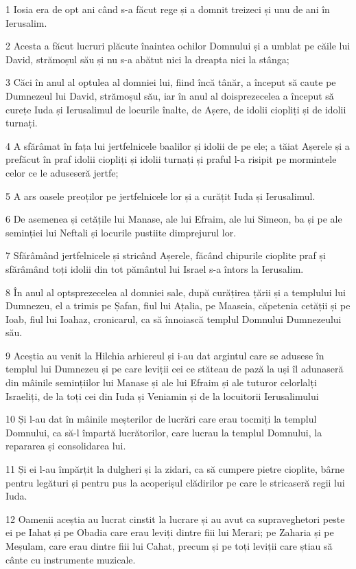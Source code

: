 \par 1 Iosia era de opt ani când s-a făcut rege și a domnit treizeci și unu de ani în Ierusalim.
\par 2 Acesta a făcut lucruri plăcute înaintea ochilor Domnului și a umblat pe căile lui David, strămoșul său și nu s-a abătut nici la dreapta nici la stânga;
\par 3 Căci în anul al optulea al domniei lui, fiind încă tânăr, a început să caute pe Dumnezeul lui David, strămoșul său, iar în anul al doisprezecelea a început să curețe Iuda și Ierusalimul de locurile înalte, de Așere, de idolii ciopliți și de idolii turnați.
\par 4 A sfărâmat în fața lui jertfelnicele baalilor și idolii de pe ele; a tăiat Așerele și a prefăcut în praf idolii ciopliți și idolii turnați și praful l-a risipit pe mormintele celor ce le aduseseră jertfe;
\par 5 A ars oasele preoților pe jertfelnicele lor și a curățit Iuda și Ierusalimul.
\par 6 De asemenea și cetățile lui Manase, ale lui Efraim, ale lui Simeon, ba și pe ale seminției lui Neftali și locurile pustiite dimprejurul lor.
\par 7 Sfărâmând jertfelnicele și stricând Așerele, făcând chipurile cioplite praf și sfărâmând toți idolii din tot pământul lui Israel s-a întors la Ierusalim.
\par 8 În anul al optsprezecelea al domniei sale, după curățirea țării și a templului lui Dumnezeu, el a trimis pe Șafan, fiul lui Ațalia, pe Maaseia, căpetenia cetății și pe Ioab, fiul lui Ioahaz, cronicarul, ca să înnoiască templul Domnului Dumnezeului său.
\par 9 Aceștia au venit la Hilchia arhiereul și i-au dat argintul care se adusese în templul lui Dumnezeu și pe care leviții cei ce stăteau de pază la uși îl adunaseră din mâinile semințiilor lui Manase și ale lui Efraim și ale tuturor celorlalți Israeliți, de la toți cei din Iuda și Veniamin și de la locuitorii Ierusalimului
\par 10 Și l-au dat în mâinile meșterilor de lucrări care erau tocmiți la templul Domnului, ca să-l împartă lucrătorilor, care lucrau la templul Domnului, la repararea și consolidarea lui.
\par 11 Și ei l-au împărțit la dulgheri și la zidari, ca să cumpere pietre cioplite, bârne pentru legături și pentru pus la acoperișul clădirilor pe care le stricaseră regii lui Iuda.
\par 12 Oamenii aceștia au lucrat cinstit la lucrare și au avut ca supraveghetori peste ei pe Iahat și pe Obadia care erau leviți dintre fiii lui Merari; pe Zaharia și pe Meșulam, care erau dintre fiii lui Cahat, precum și pe toți leviții care știau să cânte cu instrumente muzicale.
